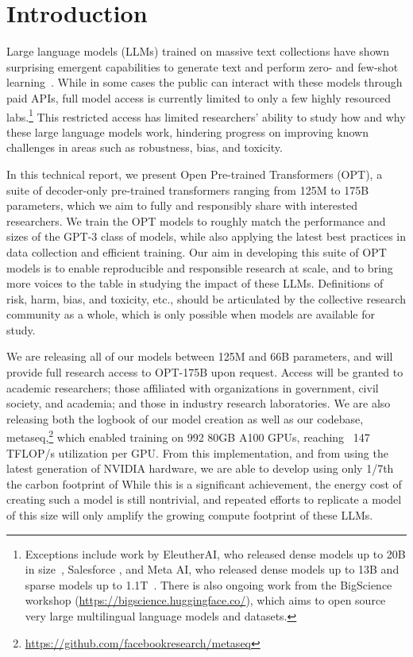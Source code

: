 \section{Introduction}

Large language models (LLMs) trained on massive text collections have shown surprising emergent capabilities to generate text and perform zero- and few-shot learning~\cite{brown2020gpt3,J1WhitePaper,megatron2022,gopher2022,palm2022}. While in some cases the public can interact with these models through paid APIs, full model access is currently limited to only a few highly resourced labs.\footnote{Exceptions include work by EleutherAI, who released dense models up to 20B in size~\cite{eleutherai2022}, Salesforce \cite{Nijkamp2022ACP}, and Meta AI, who released dense models up to 13B and sparse models up to 1.1T~\cite{1TMoE2021}. There is also ongoing work from the BigScience workshop (\url{https://bigscience.huggingface.co/}), which aims to open source very large multilingual language models and datasets.} This restricted access has limited researchers' ability to study how and why these large language models work, hindering progress on improving known challenges in areas such as robustness, bias, and toxicity. 

In this technical report, we present Open Pre-trained Transformers (OPT), a suite of decoder-only pre-trained transformers ranging from 125M to 175B parameters, which we aim to fully and responsibly share with interested researchers. We train the OPT models to roughly match the performance and sizes of the GPT-3 class of models, while also applying the latest best practices in data collection and efficient training. Our aim in developing this suite of OPT models is to enable reproducible and responsible research at scale, and to bring more voices to the table in studying the impact of these LLMs.  Definitions of risk, harm, bias, and toxicity, etc., should be articulated by the collective research community as a whole, which is only possible when models are available for study.  

We are releasing all of our models between 125M and 66B parameters, and will provide full research access to OPT-175B upon request. Access will be granted to academic researchers; those affiliated with organizations in government, civil society, and academia; and those in industry research laboratories. 
We are also releasing both the logbook of our model creation as well as our codebase, {metaseq},\footnote{\url{https://github.com/facebookresearch/metaseq}} which enabled training \OPT{} on 992 80GB A100 GPUs, reaching ~147 TFLOP/s utilization per GPU.  From this implementation, and from using the latest generation of NVIDIA hardware, we are able to develop \OPT{} using only 1/7th the carbon footprint of   While this is a significant achievement, the energy cost of creating such a model is still nontrivial, and repeated efforts to replicate a model of this size will only amplify the growing compute footprint of these LLMs.

